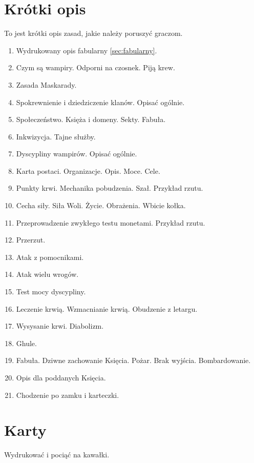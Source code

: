 \section{Krótki opis}
	To jest krótki opis zasad, jakie należy poruszyć graczom.
	\begin{enumerate}
		\item Wydrukowany opis fabularny \ref{sec:fabularny}.
		\item Czym są wampiry. Odporni na czosnek. Piją krew.
		\item Zasada Maskarady.
		\item Spokrewnienie i dziedziczenie klanów. Opisać ogólnie.
		\item Społeczeństwo. Księża i domeny. Sekty. Fabuła.
		\item Inkwizycja. Tajne służby.
		\item Dyscypliny wampirów. Opisać ogólnie.
		\item Karta postaci. Organizacje. Opis. Moce. Cele.
		\item Punkty krwi. Mechanika pobudzenia. Szał. Przykład rzutu.
		\item Cecha siły. Siła Woli. Życie. Obrażenia. Wbicie kołka.
		\item Przeprowadzenie zwykłego testu monetami. Przykład rzutu.
		\item Przerzut.
		\item Atak z pomocnikami.
		\item Atak wielu wrogów.
		\item Test mocy dyscypliny.
		\item Leczenie krwią. Wzmacnianie krwią. Obudzenie z letargu.
		\item Wysysanie krwi. Diabolizm.
		\item Ghule.
		\item Fabuła. Dziwne zachowanie Księcia. Pożar. Brak wyjścia. Bombardowanie.
		\item Opis dla poddanych Księcia.
		\item Chodzenie po zamku i karteczki.
	\end{enumerate}

		
\section{Karty}
	Wydrukować i pociąć na kawałki.
